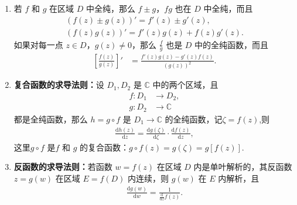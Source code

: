 \documentclass[../../main.tex]{subfiles}%
\begin{document}
\begin{theorem}\label{theorem:复变函数求导运算法则}
\begin{enumerate}[(1)]
\item 若 \( f \) 和 \( g \) 在区域 \( D \) 中全纯，那么 \( f \pm g \)，\( fg \) 也在 \( D \) 中全纯，而且
\begin{gather*}
(f(z) \pm g(z))' = f'(z) \pm g'(z), \\
(f(z)g(z))' = f'(z)g(z) + f(z)g'(z).
\end{gather*}
如果对每一点 \( z \in D \)，\( g(z) \neq 0 \)，那么 \( \frac{f}{g} \) 也是 \( D \) 中的全纯函数，而且
\begin{align*}
\left[ \frac{f(z)}{g(z)} \right]' &= \frac{f'(z)g(z) - g'(z)f(z)}{(g(z))^2}.
\end{align*}

\item \textbf{复合函数的求导法则：}设 \( D_1, D_2 \) 是 \( \mathbb{C} \) 中的两个区域，且
\begin{align*}
f: D_1 &\to D_2, \\
g: D_2 &\to \mathbb{C}
\end{align*}
都是全纯函数，那么 \( h = g \circ f \) 是 \( D_1 \to \mathbb{C} \) 的全纯函数，记$\zeta =f(z)$,则 
\begin{align*}
\frac{\mathrm{d}h\left( z \right)}{\mathrm{d}z}=\frac{\mathrm{d}g\left( \zeta \right)}{\mathrm{d}\zeta}\cdot \frac{\mathrm{d}f\left( z \right)}{\mathrm{d}z},
\end{align*}
这里\( g \circ f \) 是\( f \) 和 \( g \) 的复合函数：\( g \circ f(z) =g(\zeta)= g[f(z)] .\)

\item \textbf{反函数的求导法则：}若函数 \( w = f(z) \) 在区域 \( D \) 内是单叶解析的，其反函数 \( z = g(w) \) 在区域 \( E = f(D) \) 内连续，则 \( g(w) \) 在 \( E \) 内解析，且
\begin{align*}
\frac{\mathrm{d}g\left( w \right)}{\mathrm{d}w}=\frac{1}{\frac{\mathrm{d}}{\mathrm{d}z}f\left( z \right)}.
\end{align*}
\end{enumerate}
\end{theorem}
\end{document}
